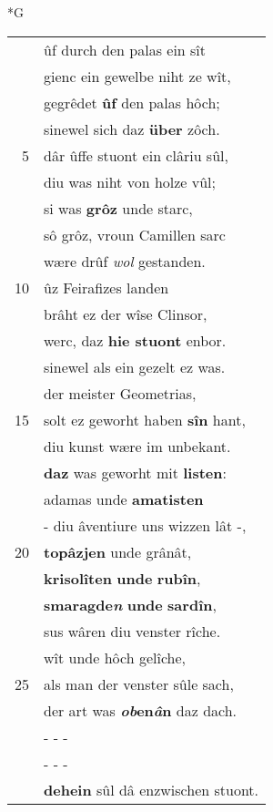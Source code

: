 \documentclass[8pt,a4paper,notitlepage]{article}
\begin{document}
\begin{table}[ht]
\begin{minipage}[t]{0.5\linewidth}
\small
\begin{center}*G
\end{center}
\begin{tabular}{rl}
 & ûf durch den palas ein sît\\ 
 & gienc ein gewelbe niht ze wît,\\ 
 & gegrêdet \textbf{ûf} den palas hôch;\\ 
 & sinewel sich daz \textbf{über} zôch.\\ 
5 & dâr ûffe stuont ein clâriu sûl,\\ 
 & diu was niht von holze vûl;\\ 
 & si was \textbf{grôz} unde starc,\\ 
 & sô grôz, vroun Camillen sarc\\ 
 & wære drûf \textit{wol} gestanden.\\ 
10 & ûz Feirafizes landen\\ 
 & brâht ez der wîse Clinsor,\\ 
 & werc, daz \textbf{hie stuont} enbor.\\ 
 & sinewel als ein gezelt ez was.\\ 
 & der meister Geometrias,\\ 
15 & solt ez geworht haben \textbf{sîn} hant,\\ 
 & diu kunst wære im unbekant.\\ 
 & \textbf{daz} was geworht mit \textbf{listen}:\\ 
 & adamas unde \textbf{amatisten}\\ 
 & - diu âventiure uns wizzen lât -,\\ 
20 & \textbf{topâzjen} unde grânât,\\ 
 & \textbf{krisolîten} \textbf{unde} \textbf{rubîn},\\ 
 & \textbf{smaragde\textit{n}} \textbf{unde} \textbf{sardîn},\\ 
 & sus wâren diu venster rîche.\\ 
 & wît unde hôch gelîche,\\ 
25 & als man der venster sûle sach,\\ 
 & der art was \textbf{\textit{ob}en\textit{â}n} daz dach.\\ 
 & \multicolumn{1}{l}{ - - - }\\ 
 & \multicolumn{1}{l}{ - - - }\\ 
 & \textbf{dehein} sûl dâ enzwischen stuont.\\ 

\end{tabular}
\end{minipage}
\end{table}
\end{document}
